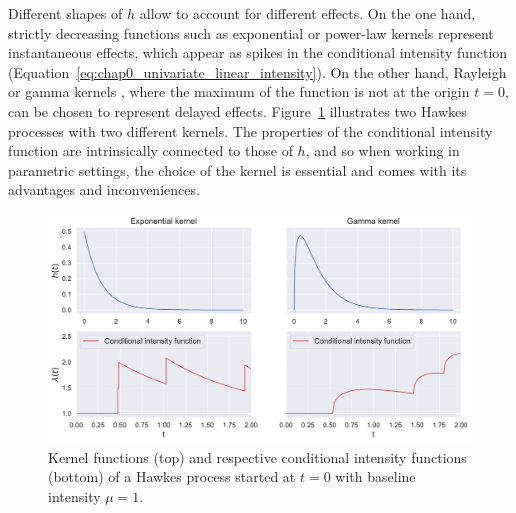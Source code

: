     Different shapes of $h$ allow to account for different effects. 
    On the one hand, strictly decreasing functions such as exponential \parencite{Ozaki1979, Ogata1988} or power-law kernels \parencite{Zhang2016} represent instantaneous effects, which appear as spikes in the conditional intensity function (Equation~\eqref{eq:chap0_univariate_linear_intensity}). 
    On the other hand, Rayleigh or gamma kernels \parencite{Lesage2022}, where the maximum of the function is not at the origin $t=0$, can be chosen to represent delayed effects. Figure~\ref{fig:chap0_two_kernel_examples} illustrates two Hawkes processes with two different kernels.
    The properties of the conditional intensity function are intrinsically connected to those of $h$, and so when working in parametric settings, the choice of the kernel is essential and comes with its advantages and inconveniences.

    \begin{figure}[!ht]
        \centering
          \includegraphics[width=\textwidth]{images/chapter0/two_kernel_examples_rev.pdf}
        \caption{Kernel functions (top) and respective conditional intensity functions (bottom) of a Hawkes process started at $t=0$ with baseline intensity $\mu=1$.%
        }
        \label{fig:chap0_two_kernel_examples}
      \end{figure}

